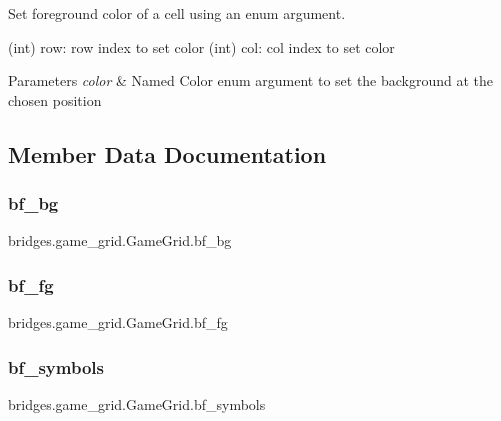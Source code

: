 Set foreground color of a cell using an enum argument. 

\begin{DoxyVerb}       (int) row: row index to set color
       (int) col: col index to set color
\end{DoxyVerb}
 
\begin{DoxyParams}{Parameters}
{\em color} & Named Color enum argument to set the background at the chosen position \\
\hline
\end{DoxyParams}


\subsection{Member Data Documentation}
\mbox{\label{classbridges_1_1game__grid_1_1_game_grid_abfef04b7aed487dd86d9c0c2ddeda881}} 
\subsubsection{\texorpdfstring{bf\_bg}{bf\_bg}}
{\footnotesize\ttfamily bridges.\+game\+\_\+grid.\+Game\+Grid.\+bf\+\_\+bg}

\mbox{\label{classbridges_1_1game__grid_1_1_game_grid_a75ff900aefac3a69b8f1c528afea9a34}} 
\subsubsection{\texorpdfstring{bf\_fg}{bf\_fg}}
{\footnotesize\ttfamily bridges.\+game\+\_\+grid.\+Game\+Grid.\+bf\+\_\+fg}

\mbox{\label{classbridges_1_1game__grid_1_1_game_grid_a1285045f0f0b9f3263c885f1428b60b0}} 
\subsubsection{\texorpdfstring{bf\_symbols}{bf\_symbols}}
{\footnotesize\ttfamily bridges.\+game\+\_\+grid.\+Game\+Grid.\+bf\+\_\+symbols}

